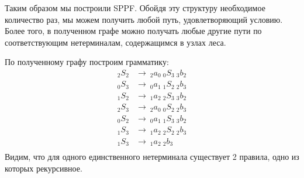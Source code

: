 \begin{example}
\begin{center}
	\end{center}
	
	Таким образом мы построили SPPF. Обойдя эту структуру необходимое количество раз, мы можем получить любой путь, удовлетворяющий условию. Более того, в полученном графе можно получать любые другие пути по соответствующим нетерминалам, содержащимся в узлах леса.
	
	По полученному графу построим грамматику:
	\begin{align*}
	_2S_2   &\to\ _2a_0\ _0S_3\ _3b_2 \\ 
	_0S_3   &\to\ _0a_1\ _1S_2\ _2b_3 \\
	_1S_2   &\to\ _1a_2\ _2S_3\ _3b_2 \\ 
	_2S_3   &\to\ _2a_0\ _0S_2\ _2b_3 \\ 
	_0S_2   &\to\ _0a_1\ _1S_3\ _3b_2 \\ 
	_1S_3   &\to\ _1a_2\ _2S_2\ _2b_3 \\ 
	_1S_3   &\to\ _1a_2\ _2b_3 \\ 
	\end{align*}
	Видим, что для одного единственного нетерминала существует 2 правила, одно из которых рекурсивное.
    
\end{example}


